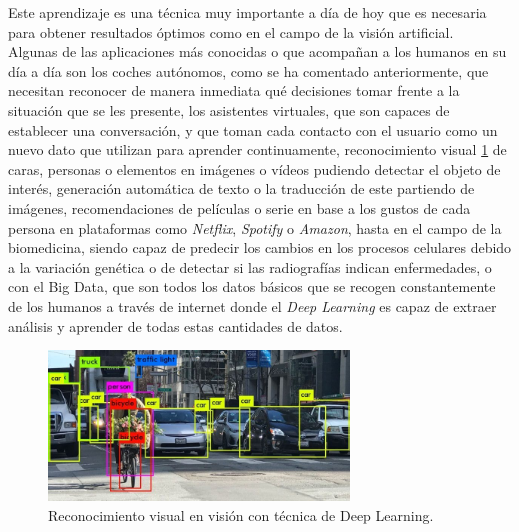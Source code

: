 Este aprendizaje es una técnica muy importante a día de hoy que es necesaria para obtener resultados óptimos como en el campo de la visión artificial.\\
Algunas de las aplicaciones más conocidas o que acompañan a los humanos en su día a día son los coches autónomos, como se ha comentado anteriormente, que necesitan reconocer de manera inmediata qué decisiones tomar frente a la situación que se les presente, los asistentes virtuales, que son capaces de establecer una conversación, y que toman cada contacto con el usuario como un nuevo dato que utilizan para aprender continuamente, reconocimiento visual \ref{fig:visual} de caras, personas o elementos en imágenes o vídeos pudiendo detectar el objeto de interés, generación automática de texto o la traducción de este partiendo de imágenes, recomendaciones de películas o serie en base a los gustos de cada persona en plataformas como \textit{Netflix}, \textit{Spotify} o \textit{Amazon}, hasta en el campo de la biomedicina, siendo capaz de predecir los cambios en los procesos celulares debido a la variación genética o de detectar si las radiografías indican enfermedades, o con el Big Data, que son todos los datos básicos que se recogen constantemente de los humanos a través de internet donde el \textit{Deep Learning} es capaz de extraer análisis y aprender de todas estas cantidades de datos.
\begin{figure} [h!]
  \begin{center}
    \includegraphics[width=8cm]{figs/visual_recognition}
  \end{center}
  \caption[]{Reconocimiento visual en visión con técnica de Deep Learning. \footnotemark}
  \label{fig:visual}
\end{figure}\\

